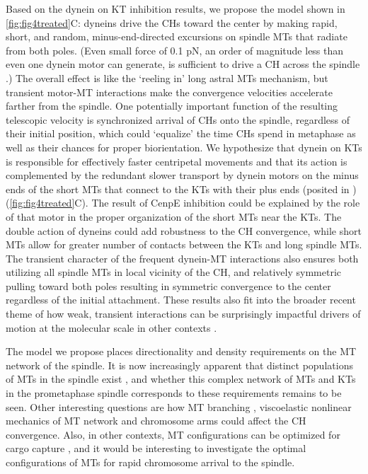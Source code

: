 \documentclass[times, twoside,onecolumn]{zHenriquesLab-StyleBioRxiv}
\begin{document}
Based on the dynein on KT inhibition results, we propose the model shown in \cref{fig:fig4treated}C: dyneins drive the CHs toward the center by making rapid, short, and random, minus-end-directed excursions on spindle MTs that radiate from both poles. (Even small force of 0.1 pN, an order of magnitude less than even one dynein motor can generate, is sufficient to drive a CH across the spindle \cite{nicklasCHROMOSOMEVELOCITYMITOSIS1965,taylorBrownianSaltatoryMovements1963}.) The overall effect is like the `reeling in' long astral MTs mechanism, but transient motor-MT interactions make the convergence velocities accelerate farther from the spindle. One potentially important function of the resulting telescopic velocity is synchronized arrival of CHs onto the spindle, regardless of their initial position, which could `equalize’ the time CHs spend in metaphase as well as their chances for proper biorientation. We hypothesize that dynein on KTs is responsible for effectively faster centripetal movements and that its action is complemented by the redundant slower transport by dynein motors on the minus ends of the short MTs that connect to the KTs with their plus ends (posited in \cite{magidson2011spatial}) (\cref{fig:fig4treated}C). The result of CenpE inhibition could be explained by the role of that motor in the proper organization of the short MTs near the KTs. The double action of dyneins could add robustness to the CH convergence, while short MTs allow for greater number of contacts between the KTs and long spindle MTs. The transient character of the frequent dynein-MT interactions also ensures both utilizing all spindle MTs in local vicinity of the CH, and relatively symmetric pulling toward both poles resulting in symmetric convergence to the center regardless of the initial attachment. These results also fit into the broader recent theme of how weak, transient interactions can be surprisingly impactful drivers of motion at the molecular scale in other contexts \cite{newby2017blueprint}.

The model we propose places directionality and density requirements on the MT network of the spindle. It is now increasingly apparent that distinct populations of MTs in the spindle exist \cite{tipton2022more}, and whether this complex network of MTs \cite{kiewisz2021three} and KTs \cite{conway2021self} in the prometaphase spindle corresponds to these requirements remains to be seen. Other interesting questions are how MT branching \cite{gouveia2022acentrosomal}, viscoelastic nonlinear mechanics of MT network \cite{suresh2022modeling} and chromosome arms \cite{meijering2022nonlinear} could affect the CH convergence. Also, in other contexts, MT configurations can be optimized for cargo capture \cite{mogre2021optimizing}, and it would be interesting to investigate the optimal configurations of MTs for rapid chromosome arrival to the spindle. 
\end{document}
